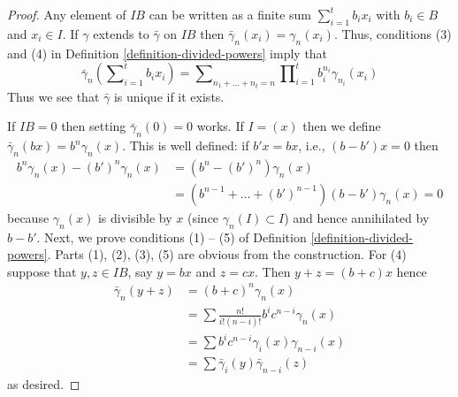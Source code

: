 \begin{proof}
Any element of $IB$ can be written as a finite sum
$\sum\nolimits_{i=1}^t b_ix_i$ with
$b_i \in B$ and $x_i \in I$. If $\gamma$ extends to $\bar\gamma$ on $IB$
then $\bar\gamma_n(x_i) = \gamma_n(x_i)$.
Thus, conditions (3) and (4) in
Definition \ref{definition-divided-powers} imply that
$$
\bar\gamma_n(\sum\nolimits_{i=1}^t b_ix_i) =
\sum\nolimits_{n_1 + \ldots + n_t = n}
\prod\nolimits_{i = 1}^t b_i^{n_i}\gamma_{n_i}(x_i)
$$
Thus we see that $\bar\gamma$ is unique if it exists.

\medskip\noindent
If $IB = 0$ then setting $\bar\gamma_n(0) = 0$ works. If $I = (x)$
then we define $\bar\gamma_n(bx) = b^n\gamma_n(x)$. This is well defined:
if $b'x = bx$, i.e., $(b - b')x = 0$ then
\begin{align*}
b^n\gamma_n(x) - (b')^n\gamma_n(x)
& =
(b^n - (b')^n)\gamma_n(x) \\
& =
(b^{n - 1} + \ldots + (b')^{n - 1})(b - b')\gamma_n(x) = 0
\end{align*}
because $\gamma_n(x)$ is divisible by $x$ (since
$\gamma_n(I) \subset I$) and hence annihilated by $b - b'$.
Next, we prove conditions (1) -- (5) of
Definition \ref{definition-divided-powers}.
Parts (1), (2), (3), (5) are obvious from the construction.
For (4) suppose that $y, z \in IB$, say $y = bx$ and $z = cx$. Then
$y + z = (b + c)x$ hence
\begin{align*}
\bar\gamma_n(y + z)
& =
(b + c)^n\gamma_n(x) \\
& =
\sum \frac{n!}{i!(n - i)!}b^ic^{n -i}\gamma_n(x) \\
& =
\sum b^ic^{n - i}\gamma_i(x)\gamma_{n - i}(x) \\
& =
\sum \bar\gamma_i(y)\bar\gamma_{n -i}(z)
\end{align*}
as desired.


\end{proof}
